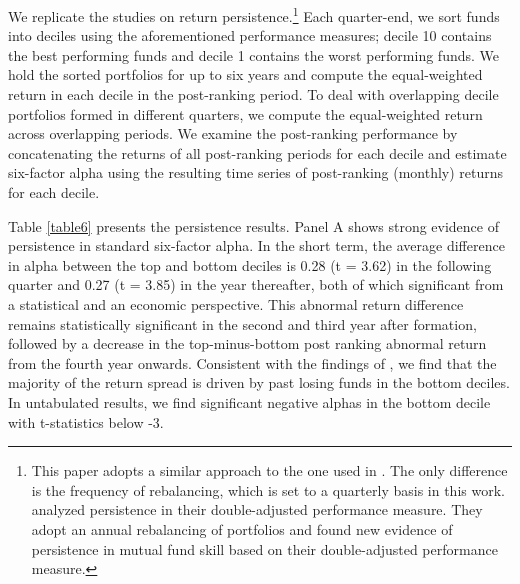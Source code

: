 We replicate the studies on return persistence.\footnote{This paper adopts a similar approach to the one used in \citet{carhart1997persistence}. The only difference is the frequency of rebalancing, which is set to a quarterly basis in this work. \citet{busse2017double} analyzed persistence in their double-adjusted performance measure. They adopt an annual rebalancing of portfolios and found new evidence of persistence in mutual fund skill based on their double-adjusted performance measure.} Each quarter-end, we sort funds into deciles using the aforementioned performance measures; decile 10 contains the best performing funds and decile 1 contains the worst performing funds. We hold the sorted portfolios for up to six years and compute the equal-weighted return in each decile in the post-ranking period. To deal with overlapping decile portfolios formed in different quarters, we compute the equal-weighted return across overlapping periods. We examine the post-ranking performance by concatenating the returns of all post-ranking periods for each decile and estimate six-factor alpha using the resulting time series of post-ranking (monthly) returns for each decile. 

Table \ref{table6} presents the persistence results. Panel A shows strong evidence of persistence in standard six-factor alpha. In the short term, the average difference in alpha between the top and bottom deciles is 0.28 (t = 3.62) in the following quarter and 0.27 (t = 3.85) in the year thereafter, both of which significant from a statistical and an economic perspective. This abnormal return difference remains statistically significant in the second and third year after formation, followed by a decrease in the top-minus-bottom post ranking abnormal return from the fourth year onwards. Consistent with the findings of \citet{carhart1997persistence}, we find that the majority of the return spread is driven by past losing funds in the bottom deciles. In untabulated results, we find significant negative alphas in the bottom decile with t-statistics below -3. 

